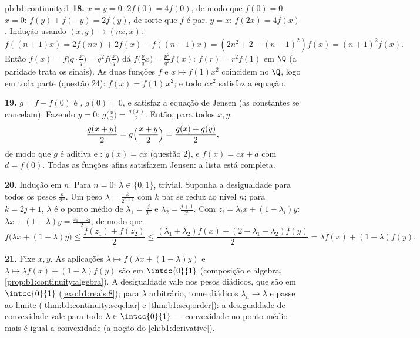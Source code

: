 \begin{solution}{pb:b1:continuity:1}
\textbf{18.} $x = y = 0$: $2f(0) = 4f(0)$, de modo que $f(0) = 0$. $x =
0$: $f(y) + f(-y) = 2f(y)$, de sorte que $f$ é par. $y = x$: $f(2x) =
4f(x)$.
Indução usando $(x, y) \to (nx, x)$:
\[
f((n{+}1)x) = 2f(nx) + 2f(x) - f((n{-}1)x)
= (2n^2 + 2 - (n-1)^2) f(x) = (n+1)^2 f(x) .
\]
Então $f(x) = f\bigl(q\cdot\frac xq\bigr) = q^2 f\bigl(\frac
xq\bigr)$ dá $f\bigl(\frac pq x\bigr) = \frac{p^2}{q^2}f(x)$:
$f(r) = r^2 f(1)$ em $\Q$ (a paridade trata os sinais). As duas
funções  $f$ e $x \mapsto f(1)x^2$ coincidem no
  $\Q$, logo em toda parte (questão 24): $f(x) =
f(1)\,x^2$; e todo $cx^2$ satisfaz a equação.

\textbf{19.} $g = f - f(0)$ é , $g(0) = 0$, e
satisfaz a equação de Jensen (as constantes se cancelam). Fazendo $y =
0$: $g\bigl(\frac x2\bigr) = \frac{g(x)}{2}$. Então, para todos $x,
y$:
\[
\frac{g(x + y)}{2} = g\Bigl(\frac{x+y}{2}\Bigr)
= \frac{g(x) + g(y)}{2} ,
\]
de modo que $g$ é aditiva e : $g(x) = cx$ (questão 2), e
$f(x) = cx + d$ com $d = f(0)$. Todas as funções afins satisfazem
Jensen: a lista está completa.

\textbf{20.} Indução em $n$. Para $n = 0$: $\lambda \in \{0,
1\}$, trivial. Suponha a desigualdade para todos os pesos
$\frac{k}{2^n}$. Um peso $\lambda = \frac{k}{2^{n+1}}$ com $k$
par se reduz ao nível $n$; para $k = 2j + 1$, $\lambda$ é o
ponto médio de $\lambda_1 = \frac{j}{2^n}$ e $\lambda_2 =
\frac{j+1}{2^n}$. Com $z_i = \lambda_i x + (1 - \lambda_i)y$:
$\lambda x + (1-\lambda)y = \frac{z_1 + z_2}{2}$, de modo que
\[
f\bigl(\lambda x + (1{-}\lambda)y\bigr)
\leq \frac{f(z_1) + f(z_2)}{2}
\leq \frac{(\lambda_1 + \lambda_2)f(x) + (2 - \lambda_1 -
\lambda_2)f(y)}{2}
= \lambda f(x) + (1 - \lambda)f(y) .
\]

\textbf{21.} Fixe $x, y$. As aplicações $\lambda \mapsto f(\lambda x +
(1 - \lambda)y)$ e $\lambda \mapsto \lambda f(x) + (1 -
\lambda)f(y)$ são  em $\intcc{0}{1}$ (composição e
álgebra, \cref{prop:b1:continuity:algebra}). A desigualdade
vale nos pesos diádicos, que são  em $\intcc{0}{1}$
(\cref{exo:b1:reals:8}); para $\lambda$ arbitrário, tome diádicos
$\lambda_n \to \lambda$ e passe ao limite
(\cref{thm:b1:continuity:seqchar} e \cref{thm:b1:seq:order}):
a desigualdade de convexidade vale para todo $\lambda \in
\intcc{0}{1}$ --- convexidade no ponto médio mais  é
igual a convexidade (a noção do \cref{ch:b1:derivative}).


\end{solution}
